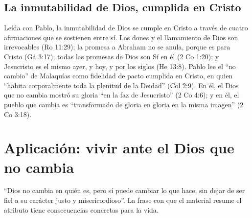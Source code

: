 \documentclass[11pt,letterpaper]{article}
\begin{document}
\subsection{La inmutabilidad de Dios, cumplida en Cristo}
Leída con Pablo, la inmutabilidad de Dios se cumple en Cristo a través de cuatro afirmaciones que se sostienen entre sí. Los dones y el llamamiento de Dios son irrevocables (Ro 11:29); la promesa a Abraham no se anula, porque es para Cristo (Gá 3:17); todas las promesas de Dios son Sí en él (2 Co 1:20); y Jesucristo es el mismo ayer, y hoy, y por los siglos (He 13:8). Pablo lee el ``no cambio'' de Malaquías como fidelidad de pacto cumplida en Cristo, en quien ``habita corporalmente toda la plenitud de la Deidad'' (Col 2:9). En él, el Dios que no cambia mostró su gloria ``en la faz de Jesucristo'' (2 Co 4:6); y en él, el pueblo que cambia es ``transformado de gloria en gloria en la misma imagen'' (2 Co 3:18).

\section{Aplicación: vivir ante el Dios que no cambia}

``Dios no cambia en quién es, pero sí puede cambiar lo que hace, sin dejar de ser fiel a su carácter justo y misericordioso''. La frase con que el material resume el atributo tiene consecuencias concretas para la vida.
\end{document}
